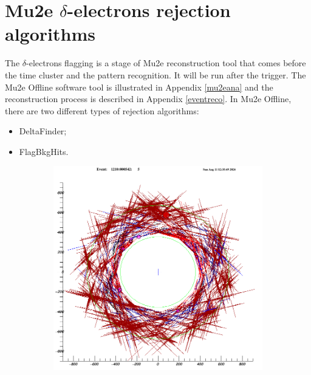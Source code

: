 \section{Mu2e $\delta$-electrons rejection algorithms}
The $\delta$-electrons flagging is a stage of Mu2e reconstruction tool that comes 
before the time cluster and the pattern recognition. It will be run after the trigger.
The Mu2e Offline software tool is illustrated in Appendix \ref{mu2eana} and 
the reconstruction process is described in Appendix \ref{eventreco}.
In Mu2e Offline, there are two different types of rejection algorithms:
\begin{itemize}
    \item DeltaFinder;
    \item FlagBkgHits.
\end{itemize}
\begin{figure}[!h]
    \begin{subfigure}[b]{0.4\linewidth}
        \centering
        \includegraphics[scale = 0.3]{figures/png/Screenshot_20240811_123612.png}
        \label{fig:bef}
    \end{subfigure}
    \begin{subfigure}[b]{0.7\linewidth}
        \centering

\end{subfigure}
\end{figure}
